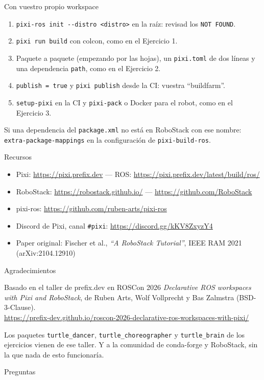 \documentclass[aspectratio=169]{beamer}
\begin{document}
\begin{frame}{Con vuestro propio workspace}
\begin{enumerate}
    \item \lstinline|pixi-ros init --distro <distro>| en la raíz: revisad los \texttt{NOT FOUND}.
    \item \lstinline|pixi run build| con colcon, como en el Ejercicio 1.
    \item Paquete a paquete (empezando por las hojas), un \lstinline|pixi.toml| de dos líneas y una dependencia \texttt{path}, como en el Ejercicio 2.
    \item \lstinline|publish = true| y \lstinline|pixi publish| desde la CI: vuestra ``buildfarm''.
    \item \lstinline|setup-pixi| en la CI y \lstinline|pixi-pack| o Docker para el robot, como en el Ejercicio 3.
\end{enumerate}
\vfill
\small Si una dependencia del \lstinline|package.xml| no está en RoboStack con ese nombre: \texttt{extra-package-mappings} en la configuración de \texttt{pixi-build-ros}.
\end{frame}

\begin{frame}{Recursos}
\small
\begin{itemize}
    \item Pixi: \url{https://pixi.prefix.dev} — ROS: \url{https://pixi.prefix.dev/latest/build/ros/}
    \item RoboStack: \url{https://robostack.github.io/} — \url{https://github.com/RoboStack}
    \item pixi-ros: \url{https://github.com/ruben-arts/pixi-ros}
    \item Discord de Pixi, canal \texttt{\#pixi}: \url{https://discord.gg/kKV8ZxyzY4}
    \item Paper original: Fischer et al., \emph{``A RoboStack Tutorial''}, IEEE RAM 2021 (arXiv:2104.12910)
\end{itemize}
\end{frame}

\begin{frame}{Agradecimientos}
\begin{block}{Basado en el taller de prefix.dev en ROSCon 2026}
\emph{Declarative ROS workspaces with Pixi and RoboStack}, de Ruben Arts, Wolf Vollprecht y Bas Zalmstra (BSD-3-Clause).\\[0.5em]
\small\url{https://prefix-dev.github.io/roscon-2026-declarative-ros-workspaces-with-pixi/}
\end{block}
\vfill
Los paquetes \texttt{turtle\_dancer}, \texttt{turtle\_choreographer} y \texttt{turtle\_brain} de los ejercicios vienen de ese taller.
\vfill
Y a la comunidad de conda-forge y RoboStack, sin la que nada de esto funcionaría.
\end{frame}

\begin{frame}
  \centering
  \Large Preguntas
\end{frame}
\end{document}
